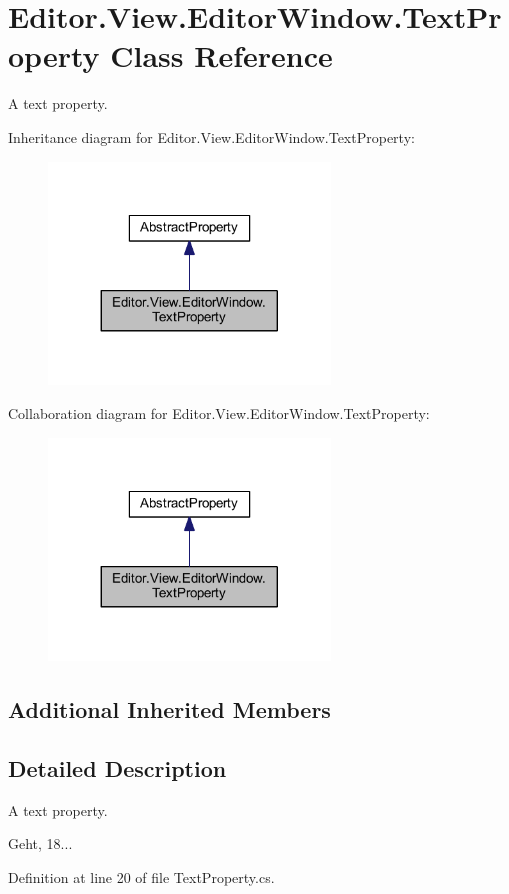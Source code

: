\section{Editor.\-View.\-Editor\-Window.\-Text\-Property Class Reference}
\label{class_editor_1_1_view_1_1_editor_window_1_1_text_property}


A text property.  




Inheritance diagram for Editor.\-View.\-Editor\-Window.\-Text\-Property\-:
\nopagebreak
\begin{figure}[H]
\begin{center}
\leavevmode
\includegraphics[width=212pt]{class_editor_1_1_view_1_1_editor_window_1_1_text_property__inherit__graph}
\end{center}
\end{figure}


Collaboration diagram for Editor.\-View.\-Editor\-Window.\-Text\-Property\-:
\nopagebreak
\begin{figure}[H]
\begin{center}
\leavevmode
\includegraphics[width=212pt]{class_editor_1_1_view_1_1_editor_window_1_1_text_property__coll__graph}
\end{center}
\end{figure}
\subsection*{Additional Inherited Members}


\subsection{Detailed Description}
A text property. 

Geht, 18... 

Definition at line 20 of file Text\-Property.\-cs.

